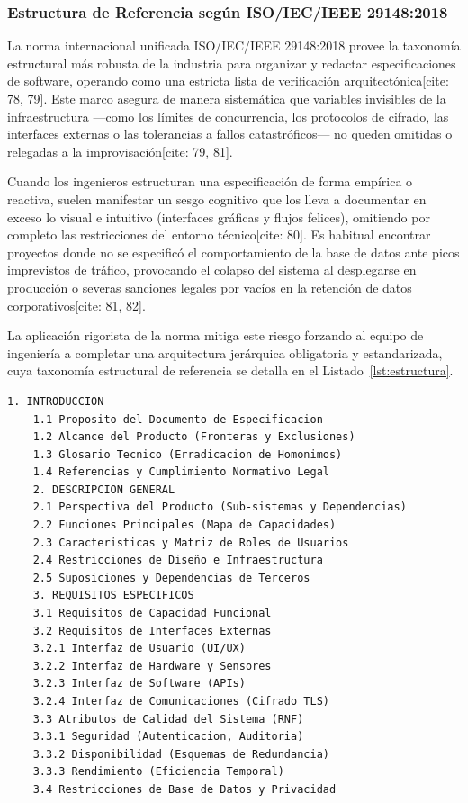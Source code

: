 \documentclass[11pt,a4paper]{article}
\begin{document}
	\subsubsection{Estructura de Referencia según ISO/IEC/IEEE 29148:2018}
	La norma internacional unificada ISO/IEC/IEEE 29148:2018 provee la taxonomía estructural más robusta de la industria para organizar y redactar especificaciones de software, operando como una estricta lista de verificación arquitectónica[cite: 78, 79]. Este marco asegura de manera sistemática que variables invisibles de la infraestructura —como los límites de concurrencia, los protocolos de cifrado, las interfaces externas o las tolerancias a fallos catastróficos— no queden omitidas o relegadas a la improvisación[cite: 79, 81].
	
	Cuando los ingenieros estructuran una especificación de forma empírica o reactiva, suelen manifestar un sesgo cognitivo que los lleva a documentar en exceso lo visual e intuitivo (interfaces gráficas y flujos felices), omitiendo por completo las restricciones del entorno técnico[cite: 80]. Es habitual encontrar proyectos donde no se especificó el comportamiento de la base de datos ante picos imprevistos de tráfico, provocando el colapso del sistema al desplegarse en producción o severas sanciones legales por vacíos en la retención de datos corporativos[cite: 81, 82].
	
	La aplicación rigorista de la norma mitiga este riesgo forzando al equipo de ingeniería a completar una arquitectura jerárquica obligatoria y estandarizada, cuya taxonomía estructural de referencia se detalla en el Listado~\ref{lst:estructura}.
	
	\begin{lstlisting}[caption={Arquitectura Estructural de una SRS conforme a la Norma ISO/IEC/IEEE 29148}, label={lst:estructura}]
	1. INTRODUCCION
	1.1 Proposito del Documento de Especificacion
	1.2 Alcance del Producto (Fronteras y Exclusiones)
	1.3 Glosario Tecnico (Erradicacion de Homonimos)
	1.4 Referencias y Cumplimiento Normativo Legal
	2. DESCRIPCION GENERAL
	2.1 Perspectiva del Producto (Sub-sistemas y Dependencias)
	2.2 Funciones Principales (Mapa de Capacidades)
	2.3 Caracteristicas y Matriz de Roles de Usuarios
	2.4 Restricciones de Diseño e Infraestructura
	2.5 Suposiciones y Dependencias de Terceros
	3. REQUISITOS ESPECIFICOS
	3.1 Requisitos de Capacidad Funcional
	3.2 Requisitos de Interfaces Externas
	3.2.1 Interfaz de Usuario (UI/UX)
	3.2.2 Interfaz de Hardware y Sensores
	3.2.3 Interfaz de Software (APIs)
	3.2.4 Interfaz de Comunicaciones (Cifrado TLS)
	3.3 Atributos de Calidad del Sistema (RNF)
	3.3.1 Seguridad (Autenticacion, Auditoria)
	3.3.2 Disponibilidad (Esquemas de Redundancia)
	3.3.3 Rendimiento (Eficiencia Temporal)
	3.4 Restricciones de Base de Datos y Privacidad
	\end{lstlisting}
	
\end{document}

